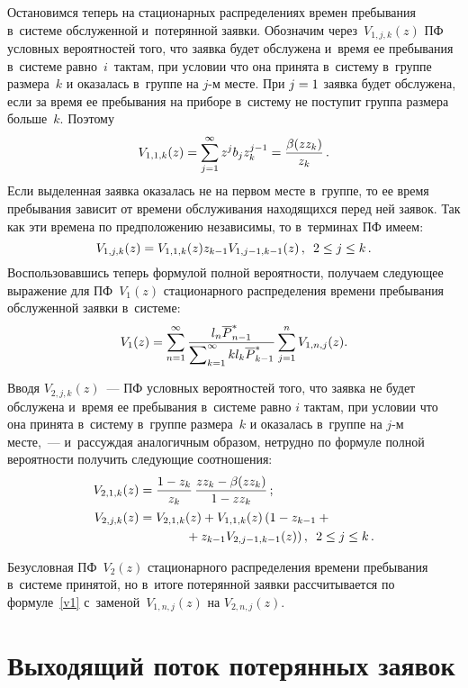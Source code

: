\begin{multicols}{2}
Остановимся теперь на стационарных распределениях
времен пребывания в~системе
обслуженной и~потерянной заявки.
Обозначим через~$V_{1,j,k}(z)$ ПФ условных вероятностей того, что
заявка будет обслужена и~время ее пребывания в~системе равно~$i$~тактам,
при условии что она принята в~систему в~группе размера~$k$ и
оказалась в~группе на $j$-м месте. При $j\hm=1$ заявка будет обслужена,
если за время ее пребывания на приборе в~систему не поступит
группа размера больше~$k$. Поэтому 
$$V_{1,1,k}(z)\hm=\sum\limits_{j=1}^\infty z^j b_j z_k^{j-1}\hm=
\fr{\beta(z z_k)}{z_k}\,.
$$
Если выделенная заявка оказалась не на первом месте в~группе, то
ее время пребывания зависит от времени обслуживания находящихся перед ней 
заявок.
Так как эти времена по предположению независимы, то в~терминах ПФ имеем: 
$$V_{1,j,k}(z)\hm= V_{1,1,k}(z)z_{k-1}V_{1,j-1,k-1}(z)\,,\enskip
2 \hm\le j \hm\le k\,.
$$
Воспользовавшись теперь формулой полной вероятности, получаем следующее
выражение для ПФ~$V_1(z)$ стационарного распределения времени пребывания
обслуженной заявки в~системе:
\begin{equation}
\label{v1}
V_1(z)=
\sum\limits_{n=1}^\infty \displaystyle\frac{\displaystyle l_n {\overline P}^*_{n-1} 
\mathstrut}{\displaystyle \sum\nolimits_{k=1}^\infty k l_k {\overline P}^*_{k-1} \mathstrut}
\sum\limits_{j=1}^n V_{1,n,j}(z).
\end{equation}

\noindent 
Вводя $V_{2,j,k}(z)$~--- ПФ условных вероятностей того, что
заявка не будет обслужена и~время ее пребывания в~системе равно $i$ 
тактам,
при условии что она принята в~систему в~группе размера~$k$ и
оказалась в~группе на $j$-м месте,~--- 
и~рассуждая аналогичным образом, нетрудно по формуле полной вероятности
получить следующие соотношения:
\begin{align*}
V_{2,1,k}(z)&=\fr{1-z_k}{z_k}\,\fr { z z_k - \beta(z z_k)}{1- z z_k}\,;\\
V_{2,j,k}(z)&=V_{2,1,k}(z)+V_{1,1,k}(z)
\left(1-z_{k-1} +{}\right.\\
&\hspace*{12mm}\left.{}+ z_{k-1} V_{2,j-1,k-1}(z)\right), \enskip 2 \le j \le k\,.
\end{align*}

\noindent Безусловная ПФ~$V_2(z)$ стационарного распределения времени 
пребывания в~системе
принятой, но в~итоге потерянной заявки рассчитывается по 
формуле~\eqref{v1}
с~заменой~$V_{1,n,j}(z)$ на $V_{2,n,j}(z)$.


\section{Выходящий поток потерянных заявок}


\end{multicols}
